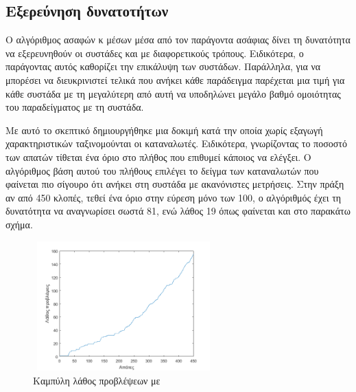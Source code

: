 \subsection{Εξερεύνηση δυνατοτήτων }
Ο αλγόριθμος ασαφών κ μέσων μέσα από τον παράγοντα ασάφιας δίνει τη δυνατότητα να εξερευνηθούν οι συστάδες και με διαφορετικούς τρόπους. Ειδικότερα, ο παράγοντας αυτός καθορίζει την επικάλυψη των συστάδων. Παράλληλα, για να μπορέσει να διευκρινιστεί τελικά που ανήκει κάθε παράδειγμα παρέχεται μια τιμή για κάθε συστάδα με τη μεγαλύτερη από αυτή να υποδηλώνει μεγάλο βαθμό ομοιότητας του παραδείγματος με τη συστάδα.\par
Με αυτό το σκεπτικό δημιουργήθηκε μια δοκιμή κατά την οποία χωρίς εξαγωγή χαρακτηριστικών ταξινομούνται οι καταναλωτές. Ειδικότερα, γνωρίζοντας το ποσοστό των απατών τίθεται ένα όριο στο πλήθος που επιθυμεί κάποιος να ελέγξει. Ο αλγόριθμος βάση αυτού του πλήθους επιλέγει το δείγμα των καταναλωτών που φαίνεται πιο σίγουρο ότι ανήκει στη συστάδα με ακανόνιστες μετρήσεις. Στην πράξη αν από 450 κλοπές, τεθεί ένα όριο στην εύρεση μόνο των 100, ο αλγόριθμός έχει τη δυνατότητα να αναγνωρίσει σωστά 81, ενώ λάθος 19 όπως φαίνεται και στο παρακάτω σχήμα.\par
\begin{figure}
\centering
 \includegraphics[width=70mm, height=50mm]{../../plots/confident_predictions.png}
\caption{Καμπύλη λάθος προβλέψεων με }
\label{fig:wrongpredFCM}
\end{figure}
